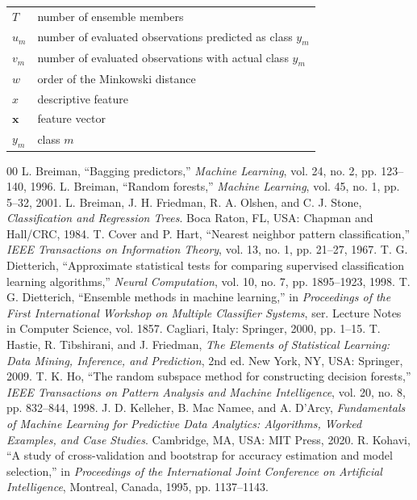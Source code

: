 \documentclass[conference]{IEEEtran}
\begin{document}
\begin{center}
\begin{tabular}{@{}lp{}@{}}
$T$ & number of ensemble members \\
$u_m$ & number of evaluated observations predicted as class $y_m$ \\
$v_m$ & number of evaluated observations with actual class $y_m$ \\
$w$ & order of the Minkowski distance \\
$x$ & descriptive feature \\
$\mathbf{x}$ & feature vector \\
$y_m$ & class $m$ \\
\bottomrule
\end{tabular}
\end{center}

\begin{thebibliography}{00}
 L. Breiman, ``Bagging predictors,'' \textit{Machine Learning}, vol. 24, no. 2, pp. 123--140, 1996.
 L. Breiman, ``Random forests,'' \textit{Machine Learning}, vol. 45, no. 1, pp. 5--32, 2001.
 L. Breiman, J. H. Friedman, R. A. Olshen, and C. J. Stone, \textit{Classification and Regression Trees}. Boca Raton, FL, USA: Chapman and Hall/CRC, 1984.
 T. Cover and P. Hart, ``Nearest neighbor pattern classification,'' \textit{IEEE Transactions on Information Theory}, vol. 13, no. 1, pp. 21--27, 1967.
 T. G. Dietterich, ``Approximate statistical tests for comparing supervised classification learning algorithms,'' \textit{Neural Computation}, vol. 10, no. 7, pp. 1895--1923, 1998.
 T. G. Dietterich, ``Ensemble methods in machine learning,'' in \textit{Proceedings of the First International Workshop on Multiple Classifier Systems}, ser. Lecture Notes in Computer Science, vol. 1857. Cagliari, Italy: Springer, 2000, pp. 1--15.
 T. Hastie, R. Tibshirani, and J. Friedman, \textit{The Elements of Statistical Learning: Data Mining, Inference, and Prediction}, 2nd ed. New York, NY, USA: Springer, 2009.
 T. K. Ho, ``The random subspace method for constructing decision forests,'' \textit{IEEE Transactions on Pattern Analysis and Machine Intelligence}, vol. 20, no. 8, pp. 832--844, 1998.
 J. D. Kelleher, B. Mac Namee, and A. D'Arcy, \textit{Fundamentals of Machine Learning for Predictive Data Analytics: Algorithms, Worked Examples, and Case Studies}. Cambridge, MA, USA: MIT Press, 2020.
 R. Kohavi, ``A study of cross-validation and bootstrap for accuracy estimation and model selection,'' in \textit{Proceedings of the International Joint Conference on Artificial Intelligence}, Montreal, Canada, 1995, pp. 1137--1143.

\end{thebibliography}
\end{document}
